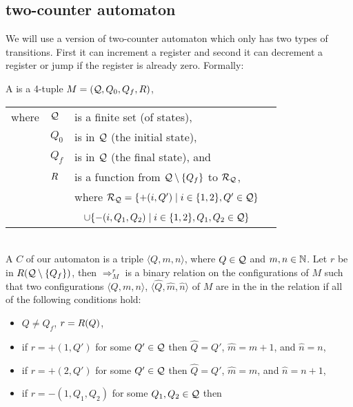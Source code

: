 \subsection{two-counter automaton} %
We will use a version of two-counter automaton which only has two types of transitions. First it can increment a register and second it can decrement a register or jump if the register is already zero. Formally:
\begin{definition}
	A  is a 4-tuple $M=(\mathcal{Q},Q_0,Q_f,R)$,
	\begin{tabular}{llp{0.78\linewidth}}
		where & $\mathcal{Q}$ & is a finite set (of states),                                                                           \\
& $Q_0$        & is in $\mathcal{Q}$ (the initial state),                                                                \\
& $Q_f$        & is in $\mathcal{Q}$ (the final state), and                                                              \\
& $R$  & is a function from $\mathcal{Q}\setminus\{Q_f\}$ to $\mathcal{R}_\autStates$,                           \\
&              & where $\mathcal{R}_{\mathcal{Q}}=\{+(i,Q')\mid i\in\{1,2\},Q'\in\mathcal{Q}\}$                             \\
&              & ~ \hphantom{where $\mathcal{R}_\autStates$}$\cup\{-(i,Q_1,Q_2)\mid i\in\{1,2\},Q_1,Q_2\in\mathcal{Q}\}$ 
	\end{tabular}\\
	A  $C$ of our automaton is a triple $\langle Q,m,n\rangle$, where $Q\in\mathcal{Q}$ and $m,n\in\mathbb{N}$.
	Let $r$ be in $R(\mathcal{Q}\setminus\{Q_f\})$, then $\Rightarrow^r_M$ is a binary relation on the configurations of $M$ such that two configurations $\langle Q,m,n\rangle$, $\langle \widehat{Q},\widehat{m},\widehat{n}\rangle$ of $M$ are in the in the relation if all of the following conditions hold:
	\begin{itemize}
		\item $Q\neq Q_f$, $r=R(Q)$,
		\item if $r=+(1,Q')$ for some $Q'\in \mathcal{Q}$ then $\widehat{Q}=Q'$, $\widehat{m}=m+1$, and $\widehat{n}=n$,
		\item if $r=+(2,Q')$ for some $Q'\in \mathcal{Q}$ then $\widehat{Q}=Q'$, $\widehat{m}=m$, and $\widehat{n}=n+1$,
		\item if $r=-(1,Q_1,Q_2)$ for some $Q_1,Q_2\in \mathcal{Q}$ then

\end{itemize}
\end{definition}
